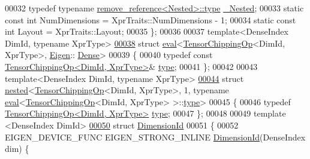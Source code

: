 \begin{DoxyCode}
00032   \textcolor{keyword}{typedef} \textcolor{keyword}{typename} \hyperlink{group___sparse_core___module}{remove\_reference<Nested>::type} 
      \hyperlink{group___sparse_core___module}{\_Nested};
00033   \textcolor{keyword}{static} \textcolor{keyword}{const} \textcolor{keywordtype}{int} NumDimensions = XprTraits::NumDimensions - 1;
00034   \textcolor{keyword}{static} \textcolor{keyword}{const} \textcolor{keywordtype}{int} Layout = XprTraits::Layout;
00035 \};
00036 
00037 \textcolor{keyword}{template}<DenseIndex DimId, \textcolor{keyword}{typename} XprType>
\hyperlink{struct_eigen_1_1internal_1_1eval_3_01_tensor_chipping_op_3_01_dim_id_00_01_xpr_type_01_4_00_01_eigen_1_1_dense_01_4}{00038} \textcolor{keyword}{struct }\hyperlink{struct_eigen_1_1internal_1_1eval}{eval}<\hyperlink{class_eigen_1_1_tensor_chipping_op}{TensorChippingOp}<DimId, XprType>, \hyperlink{namespace_eigen}{Eigen}::
      \hyperlink{struct_eigen_1_1_dense}{Dense}>
00039 \{
00040   \textcolor{keyword}{typedef} \textcolor{keyword}{const} \hyperlink{class_eigen_1_1_tensor_chipping_op}{TensorChippingOp<DimId, XprType>}& 
      \hyperlink{class_eigen_1_1_tensor_chipping_op}{type};
00041 \};
00042 
00043 \textcolor{keyword}{template}<DenseIndex DimId, \textcolor{keyword}{typename} XprType>
\hyperlink{struct_eigen_1_1internal_1_1nested_3_01_tensor_chipping_op_3_01_dim_id_00_01_xpr_type_01_4_00_013fc4e0c26ee0dd525012de858ae0206f}{00044} \textcolor{keyword}{struct }\hyperlink{struct_eigen_1_1internal_1_1nested}{nested}<\hyperlink{class_eigen_1_1_tensor_chipping_op}{TensorChippingOp}<DimId, XprType>, 1, typename 
      \hyperlink{struct_eigen_1_1internal_1_1eval}{eval}<\hyperlink{class_eigen_1_1_tensor_chipping_op}{TensorChippingOp}<DimId, XprType> >::\hyperlink{class_eigen_1_1_tensor_chipping_op}{type}>
00045 \{
00046   \textcolor{keyword}{typedef} \hyperlink{class_eigen_1_1_tensor_chipping_op}{TensorChippingOp<DimId, XprType>} \hyperlink{class_eigen_1_1_tensor_chipping_op}{type};
00047 \};
00048 
00049 \textcolor{keyword}{template} <DenseIndex DimId>
\hyperlink{struct_eigen_1_1internal_1_1_dimension_id}{00050} \textcolor{keyword}{struct }\hyperlink{struct_eigen_1_1internal_1_1_dimension_id}{DimensionId}
00051 \{
00052   EIGEN\_DEVICE\_FUNC EIGEN\_STRONG\_INLINE \hyperlink{struct_eigen_1_1internal_1_1_dimension_id}{DimensionId}(DenseIndex dim) \{

\end{DoxyCode}
